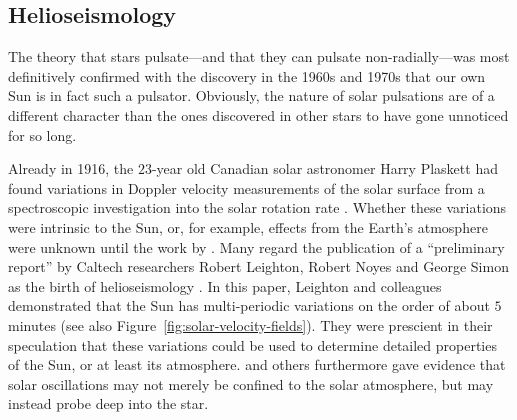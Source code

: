 





\subsection{Helioseismology} 
The theory that stars pulsate---and that they can pulsate non-radially---was most definitively confirmed with the discovery in the 1960s and 1970s that our own Sun is in fact such a pulsator. 
Obviously, the nature of solar pulsations are of a different character than the ones discovered in other stars to have gone unnoticed for so long. 

Already in 1916, the $23$-year old Canadian solar astronomer Harry Plaskett had found variations in Doppler velocity measurements of the solar surface from a spectroscopic investigation into the solar rotation rate \citep{1916ApJ....43..145P}. 
Whether these variations were intrinsic to the Sun, or, for example, effects from the Earth's atmosphere were unknown until the work by \citet{1954MNRAS.114...17H, 1956MNRAS.116...38H}. 
Many regard the publication of a ``preliminary report'' by Caltech researchers Robert Leighton, Robert Noyes and George Simon as the birth of helioseismology \citep{1962ApJ...135..474L}. 
In this paper, Leighton and colleagues demonstrated that the Sun has multi-periodic variations on the order of about $5$ minutes (see also Figure~\ref{fig:solar-velocity-fields}). 
They were prescient in their speculation that these variations could be used to determine detailed properties of the Sun, or at least its atmosphere. 
\citet{1968ApJ...152..557F} and others furthermore gave evidence that solar oscillations may not merely be confined to the solar atmosphere, but may instead probe deep into the star. 


